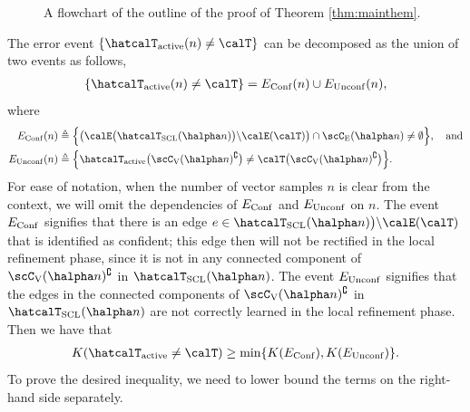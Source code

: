 \documentclass[11pt,onecolumn]{article}
\newcommand{\Active}{{\rm active}}
\begin{document}
\begin{figure}[t]
	\caption{A flowchart of the outline of the proof of Theorem \ref{thm:mainthem}.} 
	\label{fig:prooffig} 
\end{figure}
The error event $\{\hatcalT_{\Active}(n)\neq \calT\}$ can be decomposed as the union of two events as follows,
\begin{align}
	\{\hatcalT_{\Active}(n)\neq \calT\}=E_{{\rm Conf}}(n)\cup E_{{\rm Unconf}}(n),
\end{align}
where
\begin{align}
	E_{{\rm Conf}}(n)&\triangleq\Big\{\big(\calE\big(\hatcalT_{\rm{SCL}}(\halpha n)\big)\backslash \calE(\calT)\big)\cap \scC_{\mathrm{E}}(\halpha n)\neq \emptyset\Big\},\quad\text{and}\\*
	E_{{\rm Unconf}}(n)&\triangleq\Big\{\hatcalT_{\Active}\big(\scC_{\mathrm{V}}(\halpha n)^{\complement}\big)\neq \calT\big(\scC_{\mathrm{V}}(\halpha n)^{\complement}\big)\Big\}.
\end{align}
For ease of notation, when the number of vector samples $n$ is clear from the context, we will omit the dependencies of   $E_{{\rm Conf}}$ and $E_{{\rm Unconf}}$ on $n$. The event $E_{{\rm Conf}}$ signifies that there is an edge $e\in \hatcalT_{\rm{SCL}}(\halpha n)\big)\backslash \calE(\calT)$ that is identified as confident; this edge then will not be 
rectified in the local refinement phase, since it is not in any connected component of $\scC_{\mathrm{V}}(\halpha n)^{\complement}$ in $\hatcalT_{{\rm SCL}}(\halpha n)$. The event $E_{{\rm Unconf}}$ signifies that the edges in the connected components of $\scC_{\mathrm{V}}(\halpha n)^{\complement}$ 
in $\hatcalT_{{\rm SCL}}(\halpha n)$ are not correctly learned in the local refinement phase. Then we have that
\begin{align}
	K (\hatcalT_{\Active}\neq \calT)\geq \min \{K (E_{{\rm Conf}}),K (E_{{\rm Unconf}})\}.
\end{align}
To prove the desired inequality, we need to lower bound the terms on the right-hand side separately. 
\end{document}
